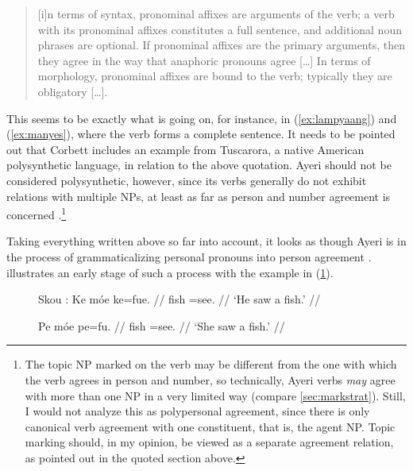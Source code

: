 \blockcquote[99--100]{corbett2006}{[i]n terms of syntax, pronominal affixes are
arguments of the verb; a verb with its pronominal affixes constitutes a full
sentence, and additional noun phrases are optional. If pronominal affixes are
the primary arguments, then they agree in the way that anaphoric pronouns agree
[…] In terms of morphology, pronominal affixes are bound to the verb; typically
they are obligatory […].}

\noindent This seems to be exactly what is going on, for instance, in
(\ref{ex:lampyaang}) and (\ref{ex:manyes}), where the verb forms a complete
sentence. It needs to be pointed out that Corbett includes an example from
Tuscarora, a native American polysynthetic language, in relation to the above
quotation. Ayeri should not be considered polysynthetic, however, since its
verbs generally do not exhibit relations with multiple NPs, at least as far as
person and number agreement is concerned
\citep[45--46]{comrie1989}.\footnote{The topic NP marked on the verb may be
different from the one with which the verb agrees in person and number, so
technically, Ayeri verbs \emph{may} agree with more than one NP in a very
limited way (compare \autoref{sec:markstrat}). Still, I would not analyze this
as polypersonal agreement, since there is only canonical verb agreement with
one constituent, that is, the agent NP. Topic marking should, in my opinion, be
viewed as a separate agreement relation, as pointed out in the quoted section
above.}

Taking everything written above so far into account, it looks as though
Ayeri is in the process of grammaticalizing personal pronouns into person
agreement \parencites[42--45]{lehmann2015}[493--497]{vangelderen2011}.
\citet{corbett2006} illustrates an early stage of such a process with the
example in (\ref{ex:agrgen}).

\begin{figure}[h]
\pex\label{ex:agrgen}%
Skou \parencite[76--77]{corbett2006}:
\a\begingl
	\gla Ke móe ke=fue.  //
	\glb \TsgM{} fish \TsgM{}=​see.\TsgM{} {} //
	\glft `He saw a fish.' //
\endgl

\a\begingl
	\gla Pe móe pe=fu.  //
	\glb \TsgF{} fish \TsgF{}=​see.\TsgF{} {} //
	\glft `She saw a fish.' //
\endgl
\xe
\end{figure}

